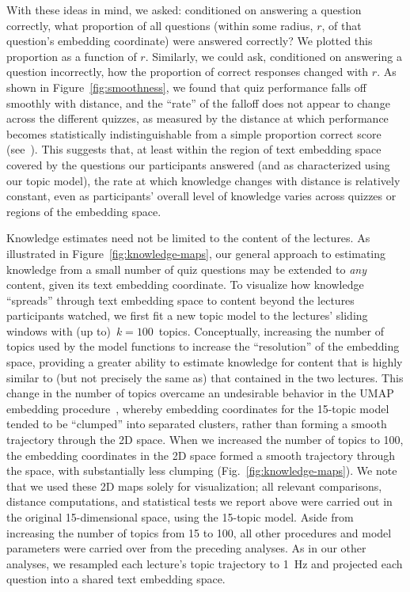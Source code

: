 \documentclass[10pt]{article}
\renewcommand{\nameref}[1]{\mbox{\textit{\oldnameref{#1}}}}
\begin{document}
With these ideas in mind, we asked: conditioned on answering a question
correctly, what proportion of all questions (within some radius, $r$, of that
question's embedding coordinate) were answered correctly? We plotted this
proportion as a function of $r$. Similarly, we could ask, conditioned on
answering a question incorrectly, how the proportion of correct responses
changed with $r$. As shown in Figure~\ref{fig:smoothness}, we found that quiz
performance falls off smoothly with distance, and the ``rate'' of the falloff
does not appear to change across the different quizzes, as measured by the
distance at which performance becomes statistically indistinguishable from a
simple proportion correct score (see~\nameref{subsec:smoothness}). This
suggests that, at least within the region of text embedding space covered by
the questions our participants answered (and as characterized using our topic
model), the rate at which knowledge changes with distance is relatively
constant, even as participants' overall level of knowledge varies across
quizzes or regions of the embedding space.

Knowledge estimates need not be limited to the content of the lectures. As
illustrated in Figure~\ref{fig:knowledge-maps}, our general approach to
estimating knowledge from a small number of quiz questions may be extended to
\textit{any} content, given its text embedding coordinate. To visualize how
knowledge ``spreads'' through text embedding space to content beyond the
lectures participants watched, we first fit a new topic model to the lectures'
sliding windows with (up to)~$k = 100$~topics. Conceptually, increasing the
number of topics used by the model functions to increase the ``resolution'' of
the embedding space, providing a greater ability to estimate knowledge for
content that is highly similar to (but not precisely the same as) that
contained in the two lectures. This change in the number of topics overcame an
undesirable behavior in the UMAP embedding procedure~\citep{McInEtal18a},
whereby embedding coordinates for the 15-topic model tended to be ``clumped''
into separated clusters, rather than forming a smooth trajectory through the 2D
space. When we increased the number of topics to 100, the embedding coordinates
in the 2D space formed a smooth trajectory through the space, with
substantially less clumping (Fig.~\ref{fig:knowledge-maps}). We note that we
used these 2D maps solely for visualization; all relevant comparisons, distance
computations, and statistical tests we report above were carried out in the
original 15-dimensional space, using the 15-topic model. Aside from increasing
the number of topics from 15 to 100, all other procedures and model parameters
were carried over from the preceding analyses. As in our other analyses, we
resampled each lecture's topic trajectory to 1~Hz and projected each question
into a shared text embedding space.
\end{document}
